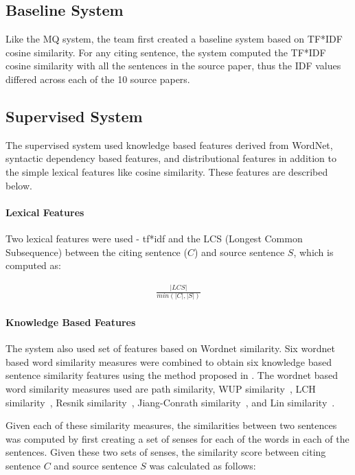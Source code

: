 \documentclass[11pt]{article}
\begin{document}
\subsection{Baseline System}

Like the MQ system, the team first created a baseline system based on TF*IDF 
cosine similarity. For any citing sentence, the system computed the TF*IDF 
cosine similarity with all the sentences in the source paper, thus the IDF 
values differed across each of the 10 source papers. 

\subsection{Supervised System}
The supervised system used knowledge based features derived from WordNet,
syntactic dependency based features, and distributional features in addition 
to the simple lexical features like cosine similarity. These features are 
described below.

\paragraph{Lexical Features} Two lexical features were used - tf*idf and the 
LCS (Longest Common Subsequence) between the citing sentence ($C$) and source 
sentence $S$, which is computed as:

\begin{eqnarray*}
  \frac{|LCS|}{min(|C|,|S|)}
\end{eqnarray*}

\paragraph{Knowledge Based Features} The system also used set of features 
based on Wordnet similarity. Six wordnet based word similarity measures were 
combined to obtain six knowledge based sentence similarity features using the 
method proposed in \cite{Banea2012}. The wordnet based word similarity 
measures used are path similarity, WUP 
similarity~\cite{Wu:1994:VSL:981732.981751}, 
LCH similarity~\cite{leacock1998combining}, 
Resnik similarity~\cite{Resnik:1995:UIC:1625855.1625914}, Jiang-Conrath 
similarity~\cite{Jiang97taxonomySimilarity}, and Lin 
similarity~\cite{Lin:1998:IDS:645527.657297}. 

Given each of these similarity measures, the similarities between two 
sentences was computed by first creating a set of senses for each of the words 
in each of the sentences. Given these two sets of senses, the similarity 
score between citing sentence $C$ and source sentence $S$ was calculated 
as follows:
\end{document}
